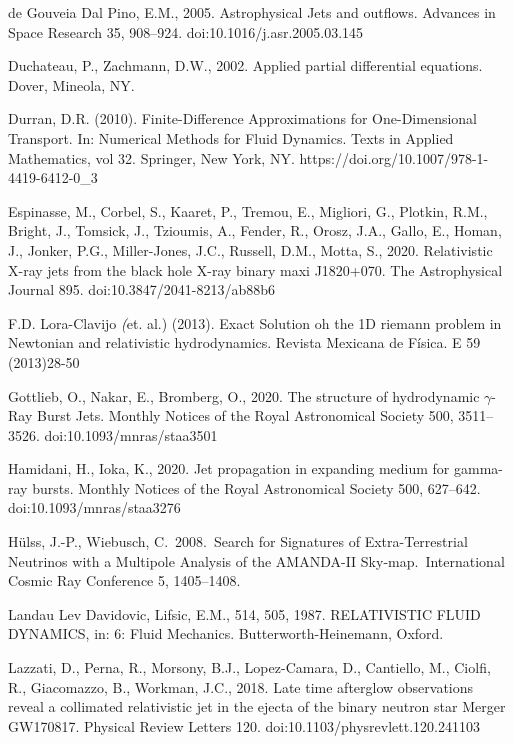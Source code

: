 \documentclass[12pt,a4paper]{book}
\begin{document}
\begin{thebibliography}{40}
 de Gouveia Dal Pino, E.M., 2005. Astrophysical Jets and outflows. Advances in Space Research 35, 908–924. doi:10.1016/j.asr.2005.03.145 

Duchateau, P., Zachmann, D.W., 2002. Applied partial differential equations. Dover, Mineola, NY.

Durran, D.R. (2010). Finite-Difference Approximations for One-Dimensional Transport. In: Numerical Methods for Fluid Dynamics. Texts in Applied Mathematics, 
vol 32. Springer, New York, NY. https://doi.org/10.1007/978-1-4419-6412-0\_3

 Espinasse, M., Corbel, S., Kaaret, P., Tremou, E., Migliori, G., Plotkin, R.M., Bright, J., Tomsick, J., Tzioumis, A., Fender, R., Orosz, J.A., Gallo, E., Homan, J., 
Jonker, P.G., Miller-Jones, J.C., Russell, D.M., Motta, S., 2020. Relativistic X-ray jets from the black hole X-ray binary maxi J1820+070. The Astrophysical Journal 895. doi:10.3847/2041-8213/ab88b6 

F.D. Lora-Clavijo \emph(et. al.) (2013). Exact Solution oh the 1D riemann problem in Newtonian and relativistic hydrodynamics. Revista Mexicana de Física. E 59 (2013)28-50 

 Gottlieb, O., Nakar, E., Bromberg, O., 2020. The structure of hydrodynamic $\gamma$-Ray Burst Jets. Monthly Notices of the Royal Astronomical Society 500, 3511–3526. 
doi:10.1093/mnras/staa3501 

 Hamidani, H., Ioka, K., 2020. Jet propagation in expanding medium for gamma-ray bursts. Monthly Notices of the Royal Astronomical Society 500, 627–642. doi:10.1093/mnras/staa3276 

 H{\"u}lss, J.-P., Wiebusch, C.\ 2008.\ Search for Signatures of Extra-Terrestrial Neutrinos with a Multipole Analysis of the AMANDA-II 
Sky-map.\ International Cosmic Ray Conference 5, 1405–1408.

Landau Lev Davidovic, Lifsic, E.M., 514, 505, 1987. RELATIVISTIC FLUID DYNAMICS, in: 6: Fluid Mechanics. Butterworth-Heinemann, Oxford.

 Lazzati, D., Perna, R., Morsony, B.J., Lopez-Camara, D., Cantiello, M., Ciolfi, R., Giacomazzo, B., Workman, J.C., 2018. Late time afterglow observations reveal a 
collimated relativistic jet in the ejecta of the binary neutron star Merger GW170817. Physical Review Letters 120. doi:10.1103/physrevlett.120.241103 


\end{thebibliography}
\end{document}
